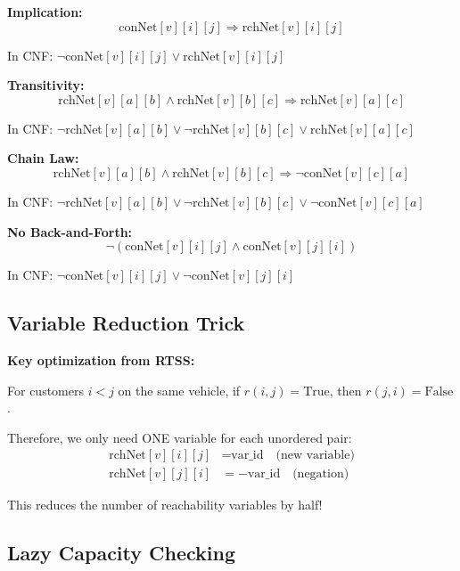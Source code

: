 \documentclass[12pt,a4paper]{article}
\theoremstyle{definition}
\begin{document}
\textbf{Implication:}
\begin{equation}
\text{conNet}[v][i][j] \Rightarrow \text{rchNet}[v][i][j]
\end{equation}

In CNF: $\neg\text{conNet}[v][i][j] \vee \text{rchNet}[v][i][j]$

\textbf{Transitivity:}
\begin{equation}
\text{rchNet}[v][a][b] \wedge \text{rchNet}[v][b][c] \Rightarrow \text{rchNet}[v][a][c]
\end{equation}

In CNF: $\neg\text{rchNet}[v][a][b] \vee \neg\text{rchNet}[v][b][c] \vee \text{rchNet}[v][a][c]$

\textbf{Chain Law:}
\begin{equation}
\text{rchNet}[v][a][b] \wedge \text{rchNet}[v][b][c] \Rightarrow \neg\text{conNet}[v][c][a]
\end{equation}

In CNF: $\neg\text{rchNet}[v][a][b] \vee \neg\text{rchNet}[v][b][c] \vee \neg\text{conNet}[v][c][a]$

\textbf{No Back-and-Forth:}
\begin{equation}
\neg(\text{conNet}[v][i][j] \wedge \text{conNet}[v][j][i])
\end{equation}

In CNF: $\neg\text{conNet}[v][i][j] \vee \neg\text{conNet}[v][j][i]$

\subsection{Variable Reduction Trick}

\textbf{Key optimization from RTSS:}

For customers $i < j$ on the same vehicle, if $r(i,j) = \text{True}$, then $r(j,i) = \text{False}$.

Therefore, we only need ONE variable for each unordered pair:
\begin{align}
\text{rchNet}[v][i][j] &= \text{var\_id} \quad \text{(new variable)} \\
\text{rchNet}[v][j][i] &= -\text{var\_id} \quad \text{(negation)}
\end{align}

This reduces the number of reachability variables by half!

\subsection{Lazy Capacity Checking}
\end{document}
